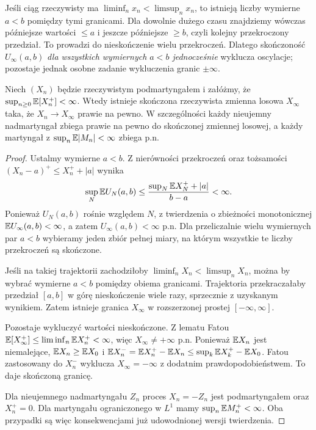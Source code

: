 \begin{uwaga}
Jeśli ciąg rzeczywisty ma
$\liminf_nx_n<\limsup_nx_n$, to istnieją
liczby wymierne $a<b$ pomiędzy tymi granicami.
Dla dowolnie dużego czasu znajdziemy wówczas
późniejsze wartości $\leq a$ i jeszcze późniejsze
$\geq b$, czyli kolejny przekroczony przedział.
To prowadzi do nieskończenie wielu przekroczeń.
Dlatego skończoność $U_\infty(a,b)$
\emph{dla wszystkich wymiernych $a<b$ jednocześnie}
wyklucza oscylacje; pozostaje jednak osobne
zadanie wykluczenia granic $\pm\infty$.
\end{uwaga}

\begin{twierdzenie}
Niech $(X_n)$ będzie rzeczywistym podmartyngałem
i załóżmy, że
$\sup_{n\geq0}\mathbb{E}[X_n^+]<\infty$.
Wtedy istnieje skończona rzeczywista zmienna
losowa $X_\infty$ taka, że
$X_n\to X_\infty$ prawie na pewno.
W szczególności każdy nieujemny nadmartyngał
zbiega prawie na pewno do skończonej zmiennej
losowej, a każdy martyngał z
$\sup_n\mathbb{E}|M_n|<\infty$ zbiega p.n.
\end{twierdzenie}
\begin{proof}
Ustalmy wymierne $a<b$. Z nierówności przekroczeń
oraz tożsamości
$(X_n-a)^+\leq X_n^++|a|$
wynika
\[
\sup_N\mathbb{E} U_N(a,b)
\leq\frac{\sup_N\mathbb{E} X_N^++|a|}{b-a}<\infty.
\]
Ponieważ $U_N(a,b)$ rośnie względem $N$,
z twierdzenia o zbieżności monotonicznej
$\mathbb{E} U_\infty(a,b)<\infty$, a zatem
$U_\infty(a,b)<\infty$ p.n. Dla przeliczalnie
wielu wymiernych par $a<b$ wybieramy jeden
zbiór pełnej miary, na którym wszystkie te liczby
przekroczeń są skończone.

Jeśli na takiej trajektorii zachodziłoby
$\liminf_n X_n<\limsup_n X_n$, można by
wybrać wymierne $a<b$ pomiędzy obiema granicami.
Trajektoria przekraczałaby przedział $[a,b]$
w górę nieskończenie wiele razy, sprzecznie
z uzyskanym wynikiem. Zatem istnieje granica
$X_\infty$ w rozszerzonej prostej $[-\infty,\infty]$.

Pozostaje wykluczyć wartości nieskończone.
Z lematu Fatou
$\mathbb{E}[X_\infty^+]\leq\liminf_n\mathbb{E} X_n^+<\infty$,
więc $X_\infty\ne+\infty$ p.n.
Ponieważ $\mathbb{E} X_n$ jest niemalejące,
$\mathbb{E} X_n\geq\mathbb{E} X_0$ i
$\mathbb{E} X_n^-=\mathbb{E} X_n^+-\mathbb{E} X_n
\leq\sup_k\mathbb{E} X_k^+-\mathbb{E} X_0$.
Fatou zastosowany do $X_n^-$ wyklucza
$X_\infty=-\infty$ z dodatnim prawdopodobieństwem.
To daje skończoną granicę.

Dla nieujemnego nadmartyngału $Z_n$ proces
$X_n=-Z_n$ jest podmartyngałem oraz
$X_n^+=0$. Dla martyngału ograniczonego w $L^1$
mamy $\sup_n\mathbb{E} M_n^+<\infty$.
Oba przypadki są więc konsekwencjami już
udowodnionej wersji twierdzenia.
\end{proof}


